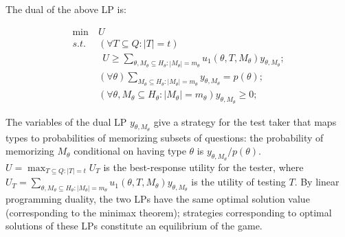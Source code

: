 \documentclass{article}
\begin{document}
The dual of the above LP is:

\begin{align}\label{eqn:dual-original}
  \min~&U\\
  s.t. \ &(\forall T \subseteq Q: |T| = t)\nonumber\\
	&~~  U \geq \sum_{\theta, M_\theta
    \subseteq H_\theta : |M_\theta| = m_\theta} u_1(\theta, T, M_\theta) y_{\theta, M_\theta};\nonumber\\
  &(\forall \theta) \sum_{M_\theta \subseteq H_\theta : |M_\theta| =
    m_\theta} y_{\theta, M_\theta} = p(\theta);\nonumber\\
  &(\forall \theta, M_\theta \subseteq H_\theta : |M_\theta| = m_\theta) y_{\theta, M_\theta} \geq 0; \nonumber
\end{align}


The variables of the dual LP $y_{\theta, M_\theta}$ give a strategy
for the test taker that maps types to probabilities of memorizing subsets
of questions: the probability of memorizing $M_\theta$ conditional on
having type $\theta$ is $y_{\theta, M_\theta} / p(\theta)$. 
$U = \max_{T \subseteq Q: |T| = t} U_T$  is the best-response utility for
the tester, 
 where $U_T = \sum_{\theta, M_\theta
    \subseteq H_\theta : |M_\theta| = m_\theta} u_1(\theta, T, M_\theta)
  y_{\theta, M_\theta}$ is the utility of testing $T$.  By linear
  programming duality, the two LPs have the same optimal
  solution value (corresponding to the minimax theorem); 
strategies corresponding to optimal solutions of these LPs
constitute an equilibrium of the game.

\end{document}

